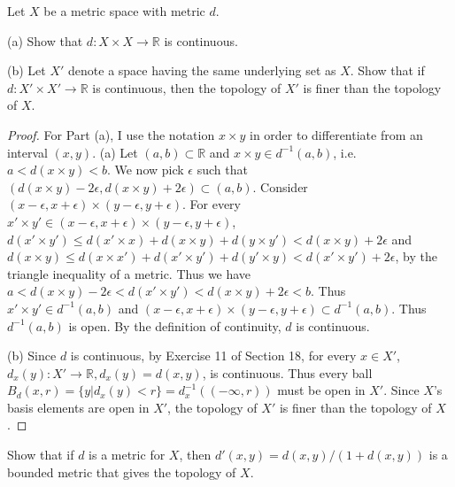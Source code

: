 \documentclass[12pt]{article}
\newenvironment{problem}[2][Problem]
{
	\begin{trivlist} 
		\item[\hskip \labelsep {\bfseries #1 #2:}]
	}
{
	\end{trivlist}
	}
\begin{document}
\newpage
\begin{problem}{20.3}
Let $X$ be a metric space with metric $d$. 

(a) Show that $d: X \times X \rightarrow \mathbb{R}$ is continuous.

(b) Let $X'$ denote a space having the same underlying set as $X$. Show that if $d: X' \times X' \rightarrow \mathbb{R}$ is continuous, then the topology of $X'$ is finer than the topology of $X$.
\end{problem}

\begin{proof}
For Part (a), I use the notation $x \times y$ in order to differentiate from an interval $(x, y)$.
(a) Let $(a, b) \subset \mathbb{R}$ and $x \times y \in d^{-1}(a, b)$, i.e. $a<d(x \times y)<b$. We now pick $\epsilon$ such that $(d(x \times y)-2\epsilon, d(x \times y)+2\epsilon)\subset(a, b)$. Consider $(x-\epsilon, x+\epsilon) \times (y-\epsilon, y+\epsilon)$. For every $x' \times y' \in (x-\epsilon, x+\epsilon) \times (y-\epsilon, y+\epsilon)$, $d(x' \times y') \leq d(x' \times x)+d(x \times y)+d(y \times y')<d(x \times y)+2\epsilon$ and $d(x \times y) \leq d(x \times x')+d(x' \times y')+d(y'\times y)<d(x'\times y')+2\epsilon$, by the triangle inequality of a metric. Thus we have $a<d(x \times y)-2\epsilon<d(x' \times y')<d(x \times y)+2\epsilon<b$. Thus $x' \times y' \in d^{-1}(a, b)$ and $(x-\epsilon, x+\epsilon)\times (y-\epsilon, y+\epsilon)\subset d^{-1}(a, b)$. Thus $d^{-1}(a, b)$ is open. By the definition of continuity, $d$ is continuous.

(b) Since $d$ is continuous, by Exercise 11 of Section 18, for every $x \in X'$, $d_x(y):X'\rightarrow \mathbb{R} , d_x(y)=d(x,y)$, is continuous. Thus every ball $B_d(x,r)=  \{y|d_x(y)<r\}= d^{-1}_x((-\infty,r))$ must be open in $X'$. Since $X$'s basis elements are open in $X'$, the topology of $X'$ is finer than the topology of $X$.
\end{proof}

\begin{problem}{20.11}
Show that if $d$ is a metric for $X$, then $d'(x, y) = d(x, y)/(1+d(x, y))$ is a bounded metric that gives the topology of $X$.
\end{problem}
\end{document}
